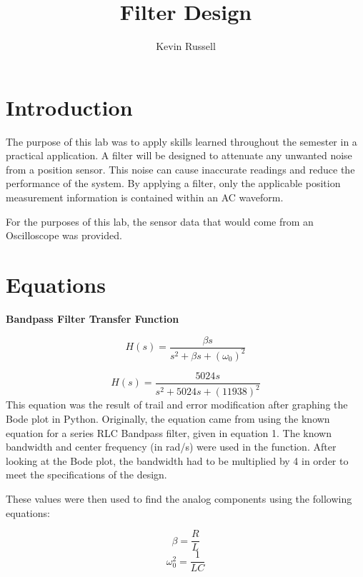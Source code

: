 \documentclass[12pt, titlepage]{article}
\author{Kevin Russell}
\title{Filter Design}
\date{\parbox{\linewidth}{\centering%
  \experimentDate
  \endgraf\bigskip
  \className\ -- Section \sectionNumber\
}}
\begin{document}
 \newpage
	    \maketitle
\newpage
    \tableofcontents
    
\newpage
    \section{Introduction}    
    The purpose of this lab was to apply skills learned throughout the semester in a practical application.  A filter will be designed to attenuate any unwanted noise from a position sensor.  This noise can cause inaccurate readings and reduce the performance of the system.  By applying a filter, only the applicable position measurement information is contained within an AC waveform.
    
    For the purposes of this lab, the sensor data that would come from an Oscilloscope was provided.
    
    \section{Equations}
  
  \textbf{Bandpass Filter Transfer Function}
  
  \begin{equation}
      H(s) = \frac{\beta s}{s^2+\beta s+(\omega _0)^2}
  \end{equation}
  
  \begin{equation}
      H(s) = \frac{5024s}{s^2+5024s+(11938)^2}
  \end{equation}
  This equation was the result of trail and error modification after graphing the Bode plot in Python.  Originally, the equation came from using the known equation for a series RLC Bandpass filter, given in equation 1.  The known bandwidth and center frequency (in rad/s) were used in the function.  After looking at the Bode plot, the bandwidth had to be multiplied by 4 in order to meet the specifications of the design.
  
  These values were then used to find the analog components using the following equations:
  
  \begin{equation}
      \beta = \frac{R}{L}
  \end{equation}
  \begin{equation}
      \omega _0 ^2 = \frac{1}{LC}
  \end{equation}
    
\end{document}
